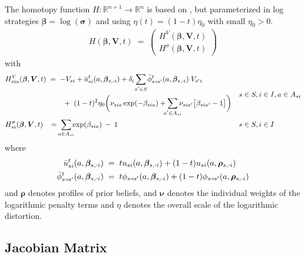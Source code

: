 \documentclass[11pt,fleqn]{article}
\newcommand{\R}{\mathbb{R}}
\newcommand{\bsigma}{\bm{\sigma}}
\newcommand{\bbeta}{\bm{\beta}}
\newcommand{\brho}{\bm{\rho}}
\newcommand{\bV}{\bm{V}}
\newcommand{\bnu}{\bm{\nu}}
\newcommand{\shortminus}{{\text{\scalebox{0.4}[1.0]{\(-\)}}}}
\newcommand{\minusi}{\shortminus i}
\newcommand{\shortrightarrow}{\parbox{4pt}{\tikz{\draw[->](0,0)--(4pt,0);}}}
\newcommand{\phiss}{\phi_{s\shortrightarrow s'}}
\newcommand{\barphiss}{\bar{\phi}_{s\shortrightarrow s'}}
\begin{document}
The homotopy function $H: \R^{n+1} \rightarrow \R^n$ is based on \citet[eqn.~X, p.~Y]{Eibelshaeuseretal2021LogTracing}, but parameterized in log strategies $\bbeta = \log(\bsigma)$ and using $\eta(t) = (1-t)\eta_0$ with small $\eta_0>0$.
\begin{align*}
	H(\bbeta,\bV,t) \;=\;
	\begin{pmatrix} 
		H^{V}(\bbeta,\bV,t) \\ 
		H^{\sigma}(\bbeta,\bV,t) 
	\end{pmatrix}
\end{align*}
with
\begin{align*}
	& \begin{aligned}
		H^V_{sia}(\bbeta,\bV,t) & \;=\; - V_{si} + \bar{u}_{si}^t(a,\bbeta_{s,\minusi}) + \delta_i \sum\limits_{\mathclap{s'\in S}} \barphiss^t(a,\bbeta_{s,\minusi}) \; V_{s'i} \\
		& \qquad \;+\; (1-t)^2\eta_0 \biggl( \nu_{sia} \exp(-\beta_{sia}) + \sum\limits_{\mathclap{a'\in A_{si}}} \nu_{sia'} \bigl[ \beta_{sia'} - 1 \bigr] \biggr)
	\end{aligned} && s\in S, i\in I, a\in A_{si} \\
	& H^\sigma_{si}(\bbeta,\bV,t) \;\; \;=\; \sum\limits_{\mathclap{a\in A_{si}}} \exp(\beta_{sia}) \:-\: 1 && s\in S, i\in I
\end{align*}
where
\begin{align*}
	\bar{u}_{si}^t(a,\bbeta_{s,\minusi}) & \;=\; tu_{si}(a,\bbeta_{s,\minusi}) + (1-t)u_{si}(a,\brho_{s,\minusi}) \\
	\barphiss^t(a,\bbeta_{s,\minusi}) & \;=\; t\phiss(a,\bbeta_{s,\minusi}) + (1-t)\phiss(a,\brho_{s,\minusi})
\end{align*}
and $\brho$ denotes profiles of prior beliefs, and $\bnu$ denotes the individual weights of the logarithmic penalty terms and $\eta$ denotes the overall scale of the logarithmic distortion.


\subsection*{Jacobian Matrix}
\end{document}
